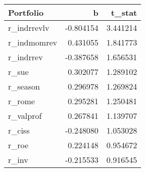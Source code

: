 \begin{tabular}{lrr}
\toprule
Portfolio & b & t_stat \\
\midrule
r_indrrevlv & -0.804154 & 3.441214 \\
r_indmomrev & 0.431055 & 1.841773 \\
r_indrrev & -0.387658 & 1.656531 \\
r_sue & 0.302077 & 1.289102 \\
r_season & 0.296978 & 1.269824 \\
r_rome & 0.295281 & 1.250481 \\
r_valprof & 0.267841 & 1.139707 \\
r_ciss & -0.248080 & 1.053028 \\
r_roe & 0.224148 & 0.954672 \\
r_inv & -0.215533 & 0.916545 \\
\bottomrule
\end{tabular}
